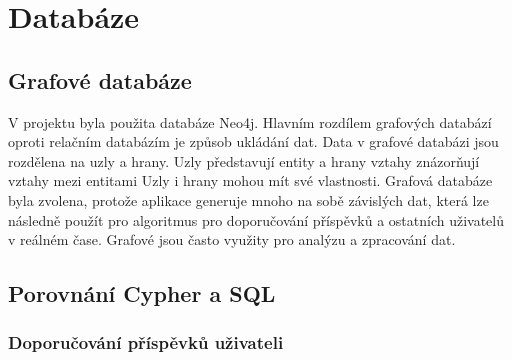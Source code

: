 \chapter{Databáze}
\section{Grafové databáze}
V projektu byla použita databáze Neo4j. Hlavním rozdílem grafových databází oproti relačním databázím je způsob ukládání dat. 
Data v grafové databázi jsou rozdělena na uzly a hrany. Uzly představují entity a hrany vztahy znázorňují vztahy mezi entitami
Uzly i hrany mohou mít své vlastnosti. Grafová databáze byla zvolena, protože aplikace generuje mnoho na sobě závislých dat, která
lze následně použít pro algoritmus pro doporučování příspěvků a ostatních uživatelů v reálném čase. Grafové jsou často využity pro
analýzu a zpracování dat.
\section{Porovnání Cypher a SQL}
\subsection{Doporučování příspěvků uživateli}